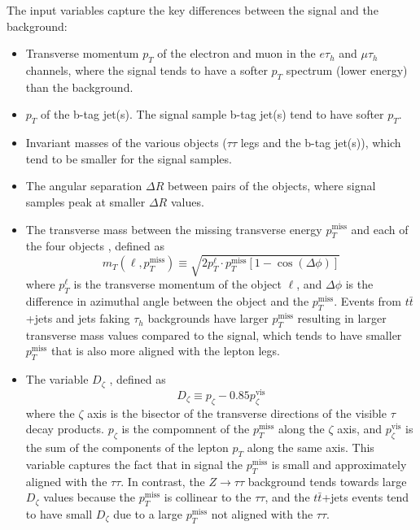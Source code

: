 The input variables capture the key differences between the signal and the background:
\begin{itemize}
    \item Transverse momentum $p_{T}$ of the electron and muon in the $e\tau_{h}$ and $\mu\tau_{h}$ channels, where the signal tends to have a softer $p_{T}$ spectrum (lower energy) than the background.
    \item $p_{T}$ of the b-tag jet(s). The signal sample b-tag jet(s) tend to have softer $p_{T}$.
    \item Invariant masses of the various objects ($\tau\tau$ legs and the b-tag jet(s)), which tend to be smaller for the signal samples.
    \item The angular separation $\Delta R$ between pairs of the objects, where signal samples peak at smaller $\Delta R$ values.
    
    \item The transverse mass between the missing transverse energy $p_{T}^{\text{miss}}$ and each of the four objects \cite{CMS-HIG-17-024}, defined as
        \begin{equation}
            m_{T}(\ell, p_{T}^{\text{miss}}) \equiv \sqrt{2 p_{T}^{\ell} \cdot p_{T}^{\text{miss}} [1 - \cos(\Delta \phi)]}
        \end{equation}
    where $p_{T}^\ell$ is the transverse momentum of the object $\ell$, and $\Delta \phi$ is the difference in azimuthal angle between the object and the $p_{T}^{\text{miss}}$. Events from $t\bar{t}$+jets and jets faking $\tau_{h}$ backgrounds have larger $p_{T}^{\text{miss}}$ resulting in larger transverse mass values compared to the signal, which tends to have smaller $p_{T}^{\text{miss}}$ that is also more aligned with the lepton legs.

    \item The variable $D_{\zeta}$ \cite{CMS-HIG-17-024}, defined as
        \begin{equation}
            D_{\zeta} \equiv p_{\zeta} - 0.85 p_{\zeta}^{\text{vis}}
        \end{equation}
        where the $\zeta$ axis is the bisector of the transverse directions of the visible $\tau$ decay products. $p_{\zeta}$ is the compomnent of the $p_{T}^{\text{miss}}$ along the $\zeta$ axis, and $p_{\zeta}^{\text{vis}}$ is the sum of the components of the lepton $p_{T}$ along the same axis. This variable captures the fact that in signal the $p_{T}^\text{miss}$ is small and approximately aligned with the $\tau\tau$. In contrast, the $Z \rightarrow \tau\tau$ background tends towards large $D_{\zeta}$ values because the $p_{T}^{\text{miss}}$ is collinear to the $\tau\tau$, and the $t\bar{t}$+jets events tend to have small $D_{\zeta}$ due to a large $p_{T}^{\text{miss}}$ not aligned with the $\tau\tau$.


\end{itemize}
